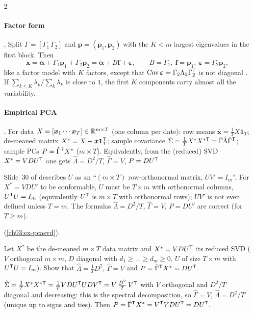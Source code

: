 \begin{paracol}{2}
\paragraph{Factor form} . Split $\Gamma=[\Gamma_1\,\Gamma_2]$ and $\bm p=(\bm p_1,\bm p_2)$ with the $K<m$
largest eigenvalues in the first block. Then
\[
  \bm x=\bm\alpha+\Gamma_1\bm p_1+\Gamma_2\bm p_2=\bm\alpha+B\bm f+\bm\varepsilon,\qquad B=\Gamma_1,\ \bm f=\bm p_1,\ \bm\varepsilon=\Gamma_2\bm p_2 ,
\]
like a factor model with $K$ factors, except that $\operatorname{Cov}\bm\varepsilon=\Gamma_2\Lambda_2\Gamma_2^{\mathsf T}$ is not diagonal
. If $\sum_{k\le K}\lambda_k/\sum_k\lambda_k$ is close to $1$, the first $K$ components carry almost all the
variability.

\paragraph{Empirical PCA} . For data $X=[\bm x_1\cdots\bm x_T]\in\mathbb{R}^{m\times T}$ (one column per
date): row means $\bar{\bm x}=\frac1TX\bm1_T$; de-meaned matrix $X^*=X-\bar{\bm x}\bm1_T^{\mathsf T}$; sample covariance
$\hat\Sigma=\frac1TX^*X^{*\mathsf T}=\hat\Gamma\hat\Lambda\hat\Gamma^{\mathsf T}$; sample PCs $P=\hat\Gamma^{\mathsf T} X^*$ ($m\times T$). Equivalently, from the
(reduced) SVD $X^*=VDU^{\mathsf T}$ one gets $\hat\Lambda=D^2/T$, $\hat\Gamma=V$, $P=DU^{\mathsf T}$\begin{coursenote}
Slide~30 of  describes $U$ as an ``$(m\times T)$ row-orthonormal matrix, $UV'=I_m$''. For $X^*=VDU'$ to be
conformable, $U$ must be $T\times m$ with orthonormal columns, $U^{\mathsf T} U=I_m$ (equivalently $U^{\mathsf T}$ is $m\times T$ with
orthonormal rows); $UV'$ is not even defined unless $T=m$. The formulas $\hat\Lambda=D^2/T$, $\hat\Gamma=V$, $P=DU'$ are
correct (for $T\ge m$).
\end{coursenote}  (\cref{ch03:ex-pcasvd}).

\begin{exercise}\label{ch03:ex-pcasvd}
Let $X^*$ be the de-meaned $m\times T$ data matrix and $X^*=VDU^{\mathsf T}$ its reduced SVD ($V$ orthogonal $m\times m$, $D$ diagonal
with $d_1\ge\dots\ge d_m\ge0$, $U$ of size $T\times m$ with $U^{\mathsf T} U=I_m$). Show that $\hat\Lambda=\frac1TD^2$, $\hat\Gamma=V$ and
$P=\hat\Gamma^{\mathsf T} X^*=DU^{\mathsf T}$.
\end{exercise}
\begin{solution}[ch03:ex-pcasvd]
$\hat\Sigma=\frac1TX^*X^{*\mathsf T}=\frac1TVDU^{\mathsf T} UDV^{\mathsf T}=V\,\frac{D^2}T\,V^{\mathsf T}$ with $V$ orthogonal and $D^2/T$ diagonal and decreasing: this is the
spectral decomposition, so $\hat\Gamma=V$, $\hat\Lambda=D^2/T$ (unique up to signs and ties). Then $P=\hat\Gamma^{\mathsf T} X^*=V^{\mathsf T} VDU^{\mathsf T}=DU^{\mathsf T}$.
\end{solution}


\end{paracol}
